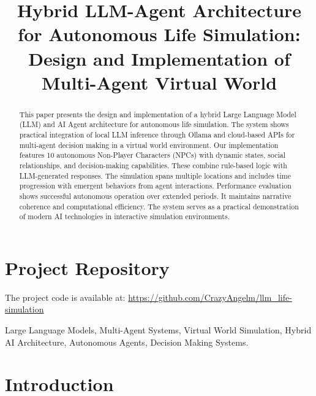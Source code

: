 \documentclass[conference]{IEEEtran}
\begin{document}
\title{Hybrid LLM-Agent Architecture for Autonomous Life Simulation: Design and Implementation of Multi-Agent Virtual World}

\author{
}

\maketitle

\section*{Project Repository}
The project code is available at: \url{https://github.com/CrazyAngelm/llm_life-simulation}

\begin{abstract}
This paper presents the design and implementation of a hybrid Large Language Model (LLM) and AI Agent architecture for autonomous life simulation. The system shows practical integration of local LLM inference through Ollama and cloud-based APIs for multi-agent decision making in a virtual world environment. Our implementation features 10 autonomous Non-Player Characters (NPCs) with dynamic states, social relationships, and decision-making capabilities. These combine rule-based logic with LLM-generated responses. The simulation spans multiple locations and includes time progression with emergent behaviors from agent interactions. Performance evaluation shows successful autonomous operation over extended periods. It maintains narrative coherence and computational efficiency. The system serves as a practical demonstration of modern AI technologies in interactive simulation environments.
\end{abstract}

\begin{IEEEkeywords}
Large Language Models, Multi-Agent Systems, Virtual World Simulation, Hybrid AI Architecture, Autonomous Agents, Decision Making Systems.
\end{IEEEkeywords}

\section{Introduction}
\end{document}
